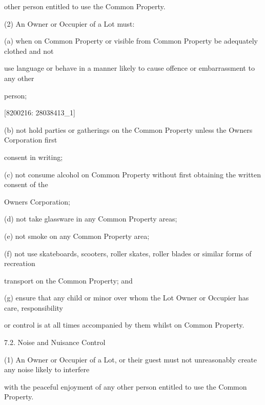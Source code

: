 \documentclass{article}
\begin{document}
{\fontsize{10.02}{1}other person entitled to use the Common Property. }

{\fontsize{9.962}{1}(2) An Owner or Occupier of a Lot must: }

{\fontsize{9.962}{1}(a) when on Common Property or visible from Common Property be adequately clothed and not }

{\fontsize{10.02}{1}use language or behave in a manner likely to cause offence or embarrassment to any other }

{\fontsize{10.02}{1}person; }

\newpage
















{\fontsize{7.02}{1}[8200216: 28038413\_1] }

{\fontsize{9.962}{1}(b) not hold parties or gatherings on the Common Property unless the Owners Corporation first }

{\fontsize{10.02}{1}consent in writing; }

{\fontsize{9.962}{1}(c) not consume alcohol on Common Property without first obtaining the written consent of the }

{\fontsize{10.02}{1}Owners Corporation; }

{\fontsize{9.962}{1}(d) not take glassware in any Common Property areas; }

{\fontsize{9.962}{1}(e) not smoke on any Common Property area; }

{\fontsize{9.962}{1}(f) not use skateboards, scooters, roller skates, roller blades or similar forms of recreation }

{\fontsize{10.02}{1}transport on the Common Property; and }

{\fontsize{9.962}{1}(g) ensure that any child or minor over whom the Lot Owner or Occupier has care, responsibility }

{\fontsize{10.02}{1}or control is at all times accompanied by them whilst on Common Property. }

{\fontsize{9.99}{1}7.2. Noise and Nuisance Control }

{\fontsize{9.962}{1}(1) An Owner or Occupier of a Lot, or their guest must not unreasonably create any noise likely to interfere }

{\fontsize{10.02}{1}with the peaceful enjoyment of any other person entitled to use the Common Property. }
\end{document}
